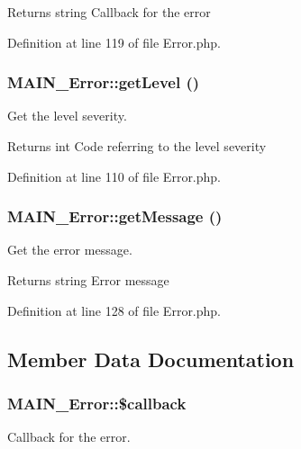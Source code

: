 \begin{DoxyReturn}{Returns}
string Callback for the error 
\end{DoxyReturn}


Definition at line 119 of file Error.php.\hypertarget{classMAIN__Error_a8bc58c66c7de8909650c8da9c13cf49d}{
\subsubsection[{getLevel}]{\setlength{\rightskip}{0pt plus 5cm}MAIN\_\-Error::getLevel ()}}
\label{d4/d5e/classMAIN__Error_a8bc58c66c7de8909650c8da9c13cf49d}
Get the level severity.

\begin{DoxyReturn}{Returns}
int Code referring to the level severity 
\end{DoxyReturn}


Definition at line 110 of file Error.php.\hypertarget{classMAIN__Error_a9ba9f938e081a5f3cc077f2ff1d29962}{
\subsubsection[{getMessage}]{\setlength{\rightskip}{0pt plus 5cm}MAIN\_\-Error::getMessage ()}}
\label{d4/d5e/classMAIN__Error_a9ba9f938e081a5f3cc077f2ff1d29962}
Get the error message.

\begin{DoxyReturn}{Returns}
string Error message 
\end{DoxyReturn}


Definition at line 128 of file Error.php.

\subsection{Member Data Documentation}
\hypertarget{classMAIN__Error_a3febaeaa4f0bfe2df03c8ce837b22acb}{
\subsubsection[{\$callback}]{\setlength{\rightskip}{0pt plus 5cm}MAIN\_\-Error::\$callback}}
\label{d4/d5e/classMAIN__Error_a3febaeaa4f0bfe2df03c8ce837b22acb}
Callback for the error. 

